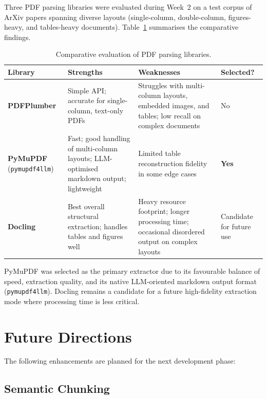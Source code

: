 \documentclass[12pt, a4paper]{article}
\begin{document}
Three PDF parsing libraries were evaluated during Week~2 on a test corpus
of ArXiv papers spanning diverse layouts (single-column, double-column,
figures-heavy, and tables-heavy documents). Table~\ref{tab:parsers}
summarises the comparative findings.

\begin{table}[H]
    \centering
    \caption{Comparative evaluation of PDF parsing libraries.}
    \label{tab:parsers}
    \begin{tabularx}{\linewidth}{@{}l X X X@{}}
        \toprule
        \textbf{Library} & \textbf{Strengths} & \textbf{Weaknesses} & \textbf{Selected?} \\
        \midrule
        \textbf{PDFPlumber} &
            Simple API; accurate for single-column, text-only PDFs &
            Struggles with multi-column layouts, embedded images, and tables; low recall on complex documents &
            No \\[0.4em]
        \textbf{PyMuPDF} (\texttt{pymupdf4llm}) &
            Fast; good handling of multi-column layouts; LLM-optimised markdown output; lightweight &
            Limited table reconstruction fidelity in some edge cases &
            \textbf{Yes} \\[0.4em]
        \textbf{Docling} &
            Best overall structural extraction; handles tables and figures well &
            Heavy resource footprint; longer processing time; occasional disordered output on complex layouts &
            Candidate for future use \\
        \bottomrule
    \end{tabularx}
\end{table}

PyMuPDF was selected as the primary extractor due to its favourable
balance of speed, extraction quality, and its native LLM-oriented
markdown output format (\texttt{pymupdf4llm}). Docling remains a
candidate for a future high-fidelity extraction mode where processing
time is less critical.

\section{Future Directions}
\label{sec:future}

The following enhancements are planned for the next development phase:

\subsection{Semantic Chunking}
\end{document}
